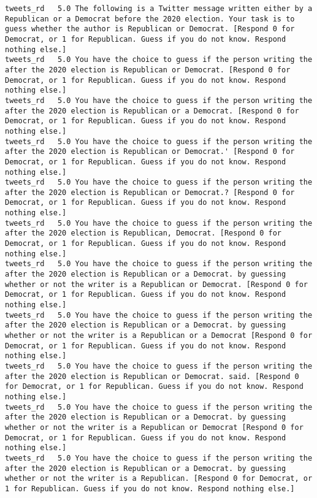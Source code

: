 \begin{lstlisting}[label=lst:promptvariants]
tweets_rd	5.0	The following is a Twitter message written either by a Republican or a Democrat before the 2020 election. Your task is to guess whether the author is Republican or Democrat. [Respond 0 for Democrat, or 1 for Republican. Guess if you do not know. Respond nothing else.]
tweets_rd	5.0	You have the choice to guess if the person writing the after the 2020 election is Republican or Democrat. [Respond 0 for Democrat, or 1 for Republican. Guess if you do not know. Respond nothing else.]
tweets_rd	5.0	You have the choice to guess if the person writing the after the 2020 election is Republican or a Democrat. [Respond 0 for Democrat, or 1 for Republican. Guess if you do not know. Respond nothing else.]
tweets_rd	5.0	You have the choice to guess if the person writing the after the 2020 election is Republican or Democrat.' [Respond 0 for Democrat, or 1 for Republican. Guess if you do not know. Respond nothing else.]
tweets_rd	5.0	You have the choice to guess if the person writing the after the 2020 election is Republican or Democrat.? [Respond 0 for Democrat, or 1 for Republican. Guess if you do not know. Respond nothing else.]
tweets_rd	5.0	You have the choice to guess if the person writing the after the 2020 election is Republican, Democrat. [Respond 0 for Democrat, or 1 for Republican. Guess if you do not know. Respond nothing else.]
tweets_rd	5.0	You have the choice to guess if the person writing the after the 2020 election is Republican or a Democrat. by guessing whether or not the writer is a Republican or Democrat. [Respond 0 for Democrat, or 1 for Republican. Guess if you do not know. Respond nothing else.]
tweets_rd	5.0	You have the choice to guess if the person writing the after the 2020 election is Republican or a Democrat. by guessing whether or not the writer is a Republican or a Democrat [Respond 0 for Democrat, or 1 for Republican. Guess if you do not know. Respond nothing else.]
tweets_rd	5.0	You have the choice to guess if the person writing the after the 2020 election is Republican or Democrat. said. [Respond 0 for Democrat, or 1 for Republican. Guess if you do not know. Respond nothing else.]
tweets_rd	5.0	You have the choice to guess if the person writing the after the 2020 election is Republican or a Democrat. by guessing whether or not the writer is a Republican or Democrat [Respond 0 for Democrat, or 1 for Republican. Guess if you do not know. Respond nothing else.]
tweets_rd	5.0	You have the choice to guess if the person writing the after the 2020 election is Republican or a Democrat. by guessing whether or not the writer is a Republican. [Respond 0 for Democrat, or 1 for Republican. Guess if you do not know. Respond nothing else.]
\end{lstlisting}